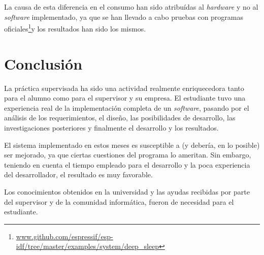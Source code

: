 \documentclass{article}
\newcommand{ \fnejemplos }{\footnote{\url{www.github.com/espressif/esp-idf/tree/master/examples/system/deep_sleep}}}
\begin{document}
    La causa de esta diferencia en el consumo han sido atribuídas al 
    \emph{hardware} y no al \emph{software} implementado, ya que se han llevado
    a cabo pruebas con programas oficiales\fnejemplos y los resultados han sido
    los mismos.


    \newpage
    \section{Conclusión}

    La práctica supervisada ha sido una actividad realmente enriquecedora tanto
    para el alumno como para el supervisor y su empresa. El estudiante tuvo una
    experiencia real de la implementación completa de un \emph{software}, 
    pasando por el análisis de los requerimientos, el diseño, las posibilidades
    de desarrollo, las investigaciones posteriores y finalmente el desarrollo y
    los resultados. \par
    El sistema implementado en estos meses es susceptible a (y debería, en lo 
    posible) ser mejorado, ya que ciertas cuestiones del programa lo ameritan.
    Sin embargo, teniendo en cuenta el tiempo empleado para el desarrollo y la
    poca experiencia del desarrollador, el resultado es muy favorable. \par
    Los conocimientos obtenidos en la universidad y las ayudas recibidas por
    parte del supervisor y de la comunidad informática, fueron de necesidad para
    el estudiante.

\end{document}
